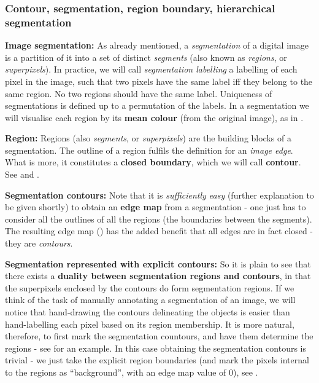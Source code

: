 \subsubsection{Contour, segmentation, region boundary, hierarchical segmentation}
\textbf{Image segmentation:} As already mentioned, a {\it segmentation} of a digital image is a partition of it into a set of distinct {\it segments} (also known as {\it regions}, or {\it superpixels}). In practice, we will call {\it segmentation labelling} a labelling of each pixel in the image, such that two pixels have the same label iff they belong to the same region. No two regions should have the same label. Uniqueness of segmentations is defined up to a permutation of the labels. In a segmentation we will visualise each region by its {\bf mean colour} (from the original image), as in .

\textbf{Region:} Regions (also {\it segments}, or {\it superpixels}) are the building blocks of a segmentation. The outline %
of a region fulfils the definition for an {\it image edge}. What is more, it constitutes a {\bf closed boundary}, which we will call {\bf contour}. See  and .

\textbf{Segmentation contours:} Note that it is {\it sufficiently easy} (further explanation to be given shortly) to obtain an {\bf edge map} from a segmentation - one just has to consider all the outlines of all the regions %
(the boundaries between the segments). The resulting edge map () has the added benefit that all edges are in fact closed - they are {\it contours}.

\textbf{Segmentation represented with explicit contours:} So it is plain to see that there exists a {\bf duality between segmentation regions and contours}, in that the superpixels enclosed by the contours do %
form segmentation regions. If we think of the task of manually annotating a segmentation of an image, we will notice that hand-drawing the contours delineating the objects is easier than hand-labelling each pixel based on its region membership. It is more natural, therefore, to first mark %
the segmentation countours, and have them determine the regions - see  for an example. In this case obtaining the segmentation contours is trivial - we just take the explicit region boundaries (and mark the pixels internal to the regions as ``background'', with an edge map value of 0), see .

